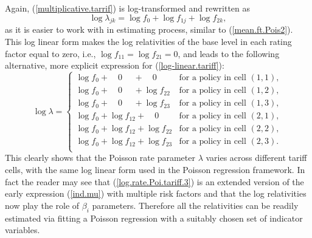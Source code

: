 \documentclass[12pt]{article}
\begin{document}
Again, (\ref{multiplicative.tarrif}) is log-transformed and rewritten as
\begin{equation}
\label{log-linear.tariff}
\log \lambda_{jk}= \log f_0 + \log f_{1j} + \log f_{2k}, 
\end{equation} as it is easier to work with in estimating process, similar to (\ref{mean.ft.Pois2}). This log linear form makes the log relativities of the base level in each rating factor equal to zero, i.e., $\log f_{11}=\log f_{21}=0$, and leads to the following alternative, more explicit expression for (\ref{log-linear.tariff}):
\begin{equation}
\label{log.rate.Poi.tariff.3}
\log \lambda=\begin{cases}
      \log f_0 + \quad 0 \quad \,\,+ \quad 0 \quad \,\,& \text{for a policy in cell $(1,1)$}, \\
            \log f_0+ \quad 0 \quad \,\,+\log f_{22}& \text{for a policy in cell $(1,2)$}, \\
                  \log f_0+ \quad 0 \quad \,\,+\log f_{23}& \text{for a policy in cell $(1,3)$}, \\
                        \log f_0+\log f_{12}+ \quad 0 \quad \,\,& \text{for a policy in cell $(2,1)$}, \\
                              \log f_0+\log f_{12}+\log f_{22}& \text{for a policy in cell $(2,2)$}, \\
                                    \log f_0+\log f_{12}+\log f_{23}& \text{for a policy in cell $(2,3)$}. \\
\end{cases}
\end{equation}
This clearly shows that the Poisson rate parameter $\lambda$ varies across different tariff cells, with the same log linear form used in the Poisson regression framework. In fact the reader may see that (\ref{log.rate.Poi.tariff.3}) is  an extended version of the early expression (\ref{ind.mu}) with multiple risk factors and that the log relativities now play the role of $\beta_i$ parameters. 
Therefore all the relativities can be readily estimated via fitting a Poisson regression with a suitably chosen set of indicator variables.

%
\end{document}
